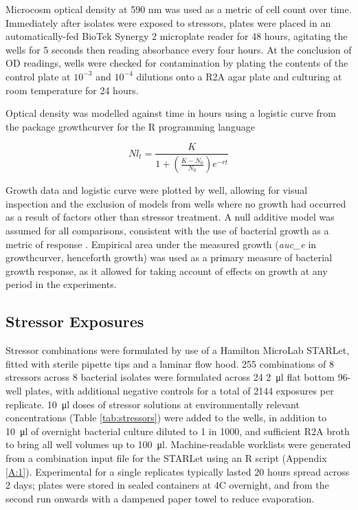 \documentclass[final,1p,times]{elsarticle}
\begin{document}
Microcosm optical density at 590 nm was used as a metric of cell count over time. Immediately after isolates were exposed to stressors, plates were placed in an automatically-fed BioTek Synergy 2 microplate reader for 48 hours, agitating the wells for 5 seconds then reading absorbance every four hours.  At the conclusion of OD readings, wells were checked for contamination by plating the contents of the control plate at $10^{-3}$ and $10^{-4}$ dilutions onto a R2A agar plate and culturing at room temperature for 24 hours.

Optical density was modelled against time in hours using a logistic curve from the package growthcurver \cite{Sprouffske2016Package} for the R programming language \cite{RCoreTeam2018R:Computing}

\begin{equation}
Nl_t=\frac{K}{1 + (\frac{K - N_0}{N_0}) e^{-rt}}
\label{E:log_curve}
\end{equation}

Growth data and logistic curve were plotted by well, allowing for visual inspection and the exclusion of models from wells where no growth had occurred as a result of factors other than stressor treatment. A null additive model was assumed for all comparisons, consistent with the use of bacterial growth as a metric of response \cite{Piggott2015}. Empirical area under the measured growth (\textit{auc\_e} in growthcurver, henceforth growth) was used as a primary measure of bacterial growth response, as it allowed for taking account of effects on growth at any period in the experiments.

\subsection{Stressor Exposures}
\label{S:2:5}

Stressor combinations were formulated by use of a Hamilton MicroLab STARLet, fitted with sterile  pipette tips and a laminar flow hood. 255 combinations of 8 stressors across 8 bacterial isolates were formulated across 24 \SI{2}{\ul} flat bottom 96-well plates, with additional negative controls for a total of 2144 exposures per replicate. \SI{10}{\ul} doses of stressor solutions at environmentally relevant concentrations (Table \ref{tab:stressors}) were added to the wells, in addition to \SI{10}{\ul} of overnight bacterial culture diluted to 1 in 1000, and sufficient R2A broth to bring all well volumes up to \SI{100}{\ul}. Machine-readable worklists were generated from a combination input file for the STARLet using an R script (Appendix \ref{A:1}). Experimental for a single replicates typically lasted 20 hours spread across 2 days; plates were stored in sealed containers at 4\textdegree C overnight, and from the second run onwards with a dampened paper towel to reduce evaporation.
\end{document}
